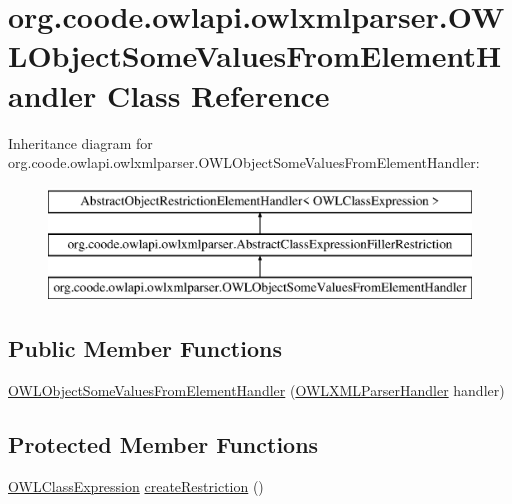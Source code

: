 \hypertarget{classorg_1_1coode_1_1owlapi_1_1owlxmlparser_1_1_o_w_l_object_some_values_from_element_handler}{\section{org.\-coode.\-owlapi.\-owlxmlparser.\-O\-W\-L\-Object\-Some\-Values\-From\-Element\-Handler Class Reference}
\label{classorg_1_1coode_1_1owlapi_1_1owlxmlparser_1_1_o_w_l_object_some_values_from_element_handler}
}
Inheritance diagram for org.\-coode.\-owlapi.\-owlxmlparser.\-O\-W\-L\-Object\-Some\-Values\-From\-Element\-Handler\-:\begin{figure}[H]
\begin{center}
\leavevmode
\includegraphics[height=3.000000cm]{classorg_1_1coode_1_1owlapi_1_1owlxmlparser_1_1_o_w_l_object_some_values_from_element_handler}
\end{center}
\end{figure}
\subsection*{Public Member Functions}
\begin{DoxyCompactItemize}
\item 
\hyperlink{classorg_1_1coode_1_1owlapi_1_1owlxmlparser_1_1_o_w_l_object_some_values_from_element_handler_ae3d201533150f7744c3223570e44c8f9}{O\-W\-L\-Object\-Some\-Values\-From\-Element\-Handler} (\hyperlink{classorg_1_1coode_1_1owlapi_1_1owlxmlparser_1_1_o_w_l_x_m_l_parser_handler}{O\-W\-L\-X\-M\-L\-Parser\-Handler} handler)
\end{DoxyCompactItemize}
\subsection*{Protected Member Functions}
\begin{DoxyCompactItemize}
\item 
\hyperlink{interfaceorg_1_1semanticweb_1_1owlapi_1_1model_1_1_o_w_l_class_expression}{O\-W\-L\-Class\-Expression} \hyperlink{classorg_1_1coode_1_1owlapi_1_1owlxmlparser_1_1_o_w_l_object_some_values_from_element_handler_a7ee5e962716d958f868217e325dc1e93}{create\-Restriction} ()
\end{DoxyCompactItemize}


